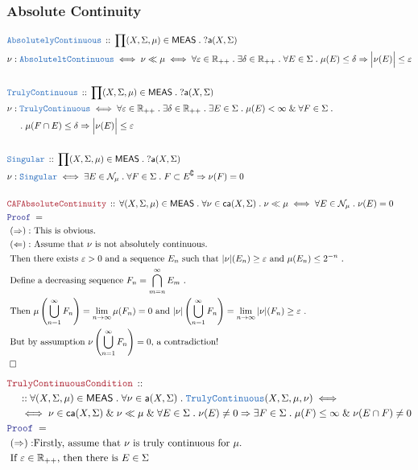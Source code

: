 \documentclass[12pt]{scrartcl}
\newcommand{\TYPE}[1]{\textcolor{NavyBlue}{\mathtt{#1}}}
\newcommand{\LOGIC}[1]{\textcolor{Blue}{\mathtt{#1}}}
\newcommand{\THM}[1]{\textcolor{Maroon}{\mathtt{#1}}}
\renewcommand{\.}{\; . \;}
\newcommand{\Theorem}[2]{& \THM{#1} \, :: \, #2 \\ & \Proof = \\ }
\newcommand{\DeclareType}[2]{& \TYPE{#1} \, :: \, #2 \\}
\newcommand{\DefineType}[3]{& #1 : \TYPE{#2} \iff #3 \\}
\newcommand{\DefineNamedType}[4]{& #1 : \TYPE{#2} \iff #3 \iff #4 \\}
\newcommand{\NewLine}{\\ & \kern 1pc}
\newcommand{\Page}[1]{ \begin{align*} #1 \end{align*}   }
\renewcommand{\And}{\; \& \;}
\newcommand{\Imply}{\Rightarrow}
\newcommand{\Reals}{\mathbb{R} }
\renewcommand{\c}{\complement}
\newcommand{\QED}{\; \square}
\newcommand{\EndProof}{& \QED \\}
\newcommand{\Proof}{\LOGIC{Proof} \; }
\newcommand{\Explain}[1]{& \text{#1.} \\}
\newcommand{\ExplainFurther}[1]{& \text{#1} \\}
\newcommand{\Exclaim}[1]{& \text{#1!} \\}
\newcommand{\Null}{\mathcal{N}}
\newcommand{\TC}{\TYPE{TrulyContinuous}}
\newcommand{\MEAS}{\mathsf{MEAS}}
\newcommand{\caf}{\mathsf{ca}}
\newcommand{\af}{\mathsf{a}}
\begin{document}
\subsubsection{Absolute Continuity}
\Page{
	\DeclareType{AbsolutelyContinuous}
	{
		\prod (X,\Sigma,\mu) \in \MEAS \.
		?\af(X,\Sigma)
	}
	\DefineNamedType{\nu}{AbsoluteltContinuous}{\nu \ll \mu}
	{
		\forall \varepsilon \in \Reals_{++} \.
		\exists \delta \in \Reals_{++} \.
		\forall E \in \Sigma \. 
		\mu(E) \le \delta \Imply \Big|\nu(E)\Big| \le \varepsilon
	}
	\\
	\DeclareType{TrulyContinuous}
	{
		\prod (X,\Sigma,\mu) \in \MEAS \.
		?\af(X,\Sigma)
	}
	\DefineType{\nu}{TrulyContinuous}
	{
		\forall \varepsilon \in \Reals_{++} \.
		\exists \delta \in \Reals_{++} \.
		\exists E \in \Sigma \. 
		 \mu(E) < \infty \And 
		\forall F \in \Sigma \. \NewLine \.
		\mu(F \cap E) \le \delta		 \Imply
		\Big|\nu(E )\Big| \le \varepsilon
	}
	\\	
	\DeclareType{Singular}
	{
		\prod (X,\Sigma,\mu) \in \MEAS \.
		?\af(X,\Sigma)
	}
	\DefineType{\nu}{Singular}
	{
		\exists E \in \Null_\mu \.
		\forall F \in \Sigma \.
		F \subset E^\c \Imply \nu(F) = 0
	}
	\\
	\Theorem{CAFAbsoluteContinuity}
	{
				\forall (X,\Sigma,\mu) \in \MEAS \.
				\forall \nu \in \caf(X,\Sigma) \.
				\nu \ll \mu
				\iff
				\forall E \in \Null_\mu \. \nu(E) = 0	
	}
	\Explain{
		$(\Imply):$ This is obvious}
	\Explain{
		$(\Leftarrow):$ Assume that $\nu$ is not absolutely continuous}
	\Explain{
		Then there exists $\varepsilon > 0$ and a sequence $E_n$ 
		such that $|\nu|(E_n) \ge \varepsilon$ and $\mu(E_n) \le 2^{-n}$
	}
	\Explain{
		Define a decreasing sequence $F_n = \bigcap^\infty_{m=n} E_m$
	}
	\Explain{
		Then $\mu\left( \bigcup^\infty_{n=1} F_n \right) =\lim_{n \to \infty} \mu(F_n) = 0$ and 
		$|\nu|\left( \bigcup^\infty_{n=1} F_n \right) = \lim_{n \to \infty} |\nu|(F_n) \ge \varepsilon$
	}
	\Exclaim{
		But by assumption  $\nu\left( \bigcup^\infty_{n=1} F_n \right) = 0$, a contradiction}
	\EndProof
}\Page{
	\Theorem{TrulyContinuousCondition}
	{
		\NewLine ::		
		\forall (X,\Sigma,\mu) \in \MEAS \.
		\forall \nu \in \af(X,\Sigma) \.
		\TC(X,\Sigma,\mu,\nu)
		\iff \NewLine \iff
		\nu \in \caf(X,\Sigma) \And \nu \ll \mu 
		\And \forall  E \in \Sigma \. 
		\nu(E) \neq 0 \Imply
		\exists F \in \Sigma \.
		\mu(F) \le \infty \And 
		\nu(E \cap F) \neq 0 
	}
	\Explain{
		$(\Rightarrow):$Firstly, assume that $\nu$ is truly continuous for $\mu$}
	\ExplainFurther{
		If $\varepsilon \in \Reals_{++}$, then there is $E \in \Sigma$
}}
\end{document}

